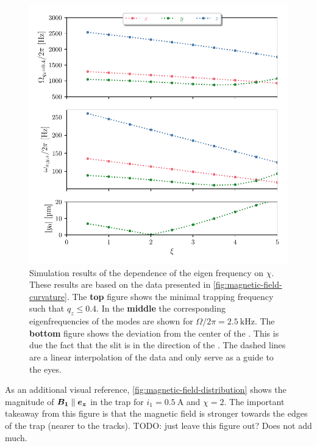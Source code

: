 \begin{figure}
    \centering
    \includegraphics{figures/data/eigen_frequency_xi_dependence.pdf}
    \caption{Simulation results of the dependence of the eigen frequency on $\chi$. These results are based on the data presented in \autoref{fig:magnetic-field-curvature}. The \textbf{top} figure shows the minimal trapping frequency such that $q_z \leq 0.4$. In the \textbf{middle} the corresponding eigenfrequencies of the modes are shown for $\Omega / 2\pi = \qty{2.5}{\kilo\hertz}$. The \textbf{bottom} figure shows the deviation from the center of the \ymode. This is due the fact that the slit is in the direction of the \ymode. The dashed lines are a linear interpolation of the data and only serve as a guide to the eyes.}
    \label{fig:eigen-frequency-xi-dependence}
\end{figure}

As an additional visual reference, \autoref{fig:magnetic-field-distribution} shows the magnitude of $\bm{B_1} \parallel \bm{e_z}$ in the trap for $i_1=\qty{0.5}{\ampere}$ and $\chi=2$. The important takeaway from this figure is that the magnetic field is stronger towards the edges of the trap (nearer to the tracks). TODO: just leave this figure out? Does not add much.

